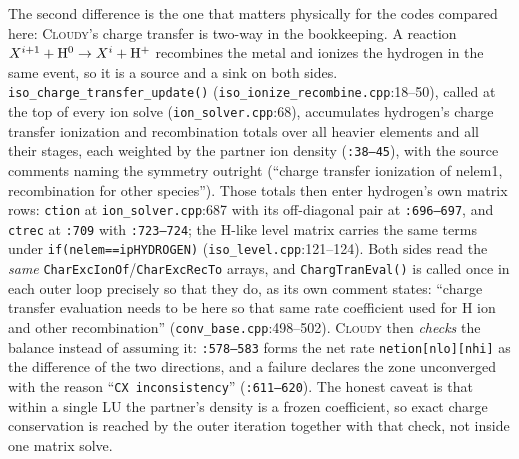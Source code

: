 \documentclass[english,a4paper]{my_memo}
\newcommand{\code}[1]{\texttt{#1}}
\newcommand{\Cloudy}{\textsc{Cloudy}}
\begin{document}
The second difference is the one that matters physically for the codes
compared here: \Cloudy{}'s charge transfer is two-way in the bookkeeping.  A
reaction $X^{i+1}+{\rm H}^0\rightarrow X^{i}+{\rm H}^{+}$ recombines the
metal and ionizes the hydrogen in the same event, so it is a source and a
sink on both sides.  \code{iso\_\allowbreak charge\_\allowbreak transfer\_\allowbreak update()}
(\code{iso\_\allowbreak ionize\_\allowbreak recombine.cpp}:18--50), called at the top of every ion
solve (\code{ion\_solver.cpp}:68), accumulates hydrogen's charge transfer
ionization and recombination totals over all heavier elements and all their
stages, each weighted by the partner ion density (\code{:38--45}), with the
source comments naming the symmetry outright (``charge transfer ionization of
nelem1, recombination for other species'').  Those totals then enter
hydrogen's own matrix rows: \code{ction} at \code{ion\_solver.cpp}:687 with
its off-diagonal pair at \code{:696--697}, and \code{ctrec} at \code{:709}
with \code{:723--724}; the H-like level matrix carries the same terms under
\code{if(nelem==ipHYDROGEN)} (\code{iso\_level.cpp}:121--124).  Both sides
read the \emph{same} \code{Char\allowbreak Exc\allowbreak Ion\allowbreak Of}/\code{Char\allowbreak Exc\allowbreak Rec\allowbreak To} arrays, and
\code{ChargTranEval()} is called once in each outer loop precisely so that
they do, as its own comment states: ``charge transfer evaluation needs to be
here so that same rate coefficient used for H ion and other recombination''
(\code{conv\_base.cpp}:498--502).  \Cloudy{} then \emph{checks} the balance
instead of assuming it: \code{:578--583} forms the net rate
\code{netion[nlo][nhi]} as the difference of the two directions, and a
failure declares the zone unconverged with the reason ``\code{CX
inconsistency}'' (\code{:611--620}).  The honest caveat is that within a
single LU the partner's density is a frozen coefficient, so exact charge
conservation is reached by the outer iteration together with that check, not
inside one matrix solve.
\end{document}
